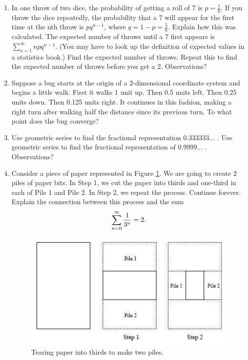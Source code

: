 \begin{enumerate}
\item In one throw of two dice, the probability of getting a roll of 7 is $
p = \frac{1}{6}$.  If you throw the dice repeatedly, the probability that a 7 will appear for the first time at the nth throw is $
pq^{n - 1} $, where $q = 1 - p = \frac{5}{6}$.  Explain how this was calculated.  The expected number of throws until a 7 first appears is $
\displaystyle\sum\limits_{n = 1}^\infty  {npq^{n - 1} } $.  (You may have to look up the definition of expected values in a statistics book.)  Find the expected number of throws.  \cite{FWG}  Repeat this to find the expected number of throws before you get a 2.  Observations?

\item Suppose a bug starts at the origin of a 2-dimensional coordinate system and begins a little walk.  First it walks 1 unit up.  Then 0.5 units left.  Then 0.25 units down.  Then 0.125 units right.  It continues in this fashion, making a right turn after walking half the distance since its previous turn.  To what point does the bug converge?  \cite{SBS}

\item Use geometric series to find the fractional representation 0.333333... .  Use geometric series to find the fractional representation of 0.9999... .  Observations?

\item Consider a piece of paper represented in Figure \ref{ThirdEqualHalf}.  We are going to create 2 piles of paper bits.  In Step 1,  we cut the paper into thirds and one-third in each of Pile 1 and Pile 2.  In Step 2, we repeat the process.  Continue forever.  Explain the connection between this process and the sum 
$$\sum_{n=0}^\infty {1\over 3^n} = 2.$$

\begin{figure}[ht]
	\centering
		\includegraphics{TeXGraphics/Chapter8Fig.jpg}
	\caption{Tearing paper into thirds to make two piles.}
	\label{ThirdEqualHalf}
\end{figure}


\end{enumerate}
